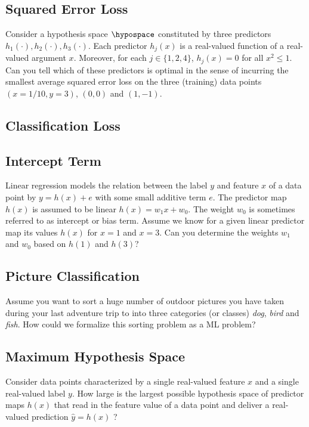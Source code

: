 \documentclass[12pt]{report}
\begin{document}
  \subsection{Squared Error Loss}
 \label{ex_2_4}
 Consider a hypothesis space $\hypospace$ constituted by three predictors $h_{1}(\cdot), h_{2}(\cdot),h_{3}(\cdot)$. 
 Each predictor $h_{j}(x)$ is a real-valued function of a real-valued argument $x$. Moreover, for each $j \in \{1,2,4\}$, 
 $h_{j}(x) = 0$ for all $x^2 \leq 1$. Can you tell which of these predictors is optimal in the sense of incurring the 
 smallest average squared error loss on the three (training) data points $(x=1/10,y=3)$, $(0,0)$ and $(1,-1)$. 
 
 \subsection{Classification Loss} 
 \label{ex_2_classif_loss}
 \begin{center}
 \end{center}
 
 \subsection{Intercept Term}
 \label{ex_2_5}
 Linear regression models the relation between the label $y$ and feature $x$ of 
 a data point by $y = h(x) + e$ with some small additive term $e$. The predictor 
 map $h(x)$ is assumed to be linear $h(x) =w_1 x + w_0$. The weight $w_{0}$ is 
 sometimes referred to as intercept or bias term. Assume we know for a given 
 linear predictor map its values $h(x)$ for $x=1$ and $x=3$. Can you determine 
 the weights $w_{1}$ and $w_{0}$ based on $h(1)$ and $h(3)$?
 
 \subsection{Picture Classification} 
 \label{ex_2_6}
Assume you want to sort a huge number of outdoor pictures you have taken during 
your last adventure trip to into three categories (or classes) 
\emph{dog}, \emph{bird} and \emph{fish}. How could we formalize this sorting 
problem as a ML problem? 

 \subsection{Maximum Hypothesis Space} 
\label{ex_2_7}
Consider data points characterized by a single real-valued feature $x$ and a 
single real-valued label $y$. How large is the largest possible hypothesis space 
of predictor maps $h(x)$ that read in the feature value of a data point and 
deliver a real-valued prediction $\hat{y}=h(x)$ ? 
\end{document}
